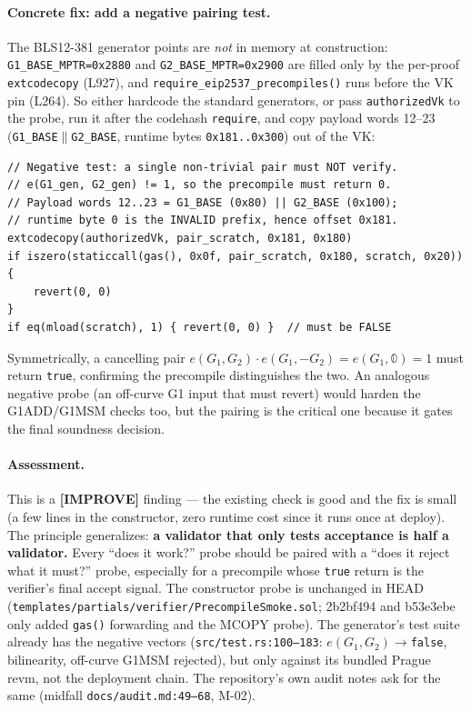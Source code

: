\paragraph{Concrete fix: add a negative pairing test.}
The BLS12-381 generator points are \emph{not} in memory at
construction: \texttt{G1\_\allowbreak{}BASE\_\allowbreak{}MPTR=0x2880} and
\texttt{G2\_\allowbreak{}BASE\_\allowbreak{}MPTR=0x2900} are filled only by the per-proof
\texttt{extcodecopy} (L927), and \texttt{require\_\allowbreak{}eip2537\_\allowbreak{}precompiles()}
runs before the VK pin (L264).  So either hardcode the
standard generators, or pass \texttt{authorizedVk} to the probe,
run it after the codehash \texttt{require}, and copy payload words
12--23 (\texttt{G1\_BASE}$\|$\texttt{G2\_BASE}, runtime bytes
\texttt{0x181..0x300}) out of the VK:
\begin{lstlisting}[style=yul]
// Negative test: a single non-trivial pair must NOT verify.
// e(G1_gen, G2_gen) != 1, so the precompile must return 0.
// Payload words 12..23 = G1_BASE (0x80) || G2_BASE (0x100);
// runtime byte 0 is the INVALID prefix, hence offset 0x181.
extcodecopy(authorizedVk, pair_scratch, 0x181, 0x180)
if iszero(staticcall(gas(), 0x0f, pair_scratch, 0x180, scratch, 0x20)) {
    revert(0, 0)
}
if eq(mload(scratch), 1) { revert(0, 0) }  // must be FALSE
\end{lstlisting}
Symmetrically, a cancelling pair
$e(G_1,G_2)\cdot e(G_1,-G_2)=e(G_1,\mathbb{0})=1$ must return
\texttt{true}, confirming the precompile distinguishes the two.
An analogous negative probe (an off-curve G1 input that must
revert) would harden the G1ADD/G1MSM checks too, but the pairing
is the critical one because it gates the final soundness
decision.

\paragraph{Assessment.} This is a
\textcolor{codegenblue}{\textbf{[IMPROVE]}} finding --- the
existing check is good and the fix is small (a few lines in the
constructor, zero runtime cost since it runs once at deploy).
The principle generalizes: \textbf{a validator that only tests
acceptance is half a validator.} Every ``does it work?'' probe
should be paired with a ``does it reject what it must?'' probe,
especially for a precompile whose \texttt{true} return is the
verifier's final accept signal.  The constructor probe
is unchanged in HEAD (\texttt{templates/\allowbreak{}partials/\allowbreak{}verifier/\allowbreak{}PrecompileSmoke.sol};
2b2bf494 and b53e3ebe only added \texttt{gas()} forwarding and the MCOPY probe). The generator's
test suite already has the negative vectors
(\texttt{src/\allowbreak{}test.rs:100--183}: $e(G_1,G_2)\to$\texttt{false},
bilinearity, off-curve G1MSM rejected), but only against its bundled
Prague revm, not the deployment chain. The repository's own audit
notes ask for the same (midfall \texttt{docs/\allowbreak{}audit.md:49--68}, M-02).

